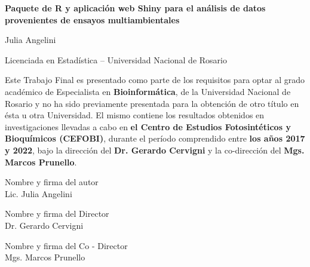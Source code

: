 
\begin{center}
\textbf{\Large{Paquete de R y aplicación web Shiny para el análisis de datos provenientes de ensayos multiambientales}}
\end{center}

\vspace{1.5cm}

\begin{center}
Julia Angelini

\vspace{0.5cm}
Licenciada en Estadística – Universidad Nacional de Rosario
\end{center}
\vspace{1.5cm}
Este Trabajo Final es presentado como parte de los requisitos para optar al grado académico de Especialista en \textbf{Bioinformática}, de la Universidad Nacional de Rosario y no ha sido previamente presentada para la obtención de otro título en ésta u otra Universidad. El mismo contiene los resultados obtenidos en investigaciones llevadas a cabo en \textbf{el Centro de Estudios Fotosintéticos y Bioquímicos (CEFOBI)}, durante el período comprendido entre \textbf{los años 2017 y 2022}, bajo la dirección del \textbf{Dr. Gerardo Cervigni} y la co-dirección del \textbf{Mgs. Marcos Prunello}.  

\vspace{1.25cm}
Nombre y firma del autor\\
\vspace{0.05cm}
\hspace{0.95cm}Lic. Julia Angelini

\vspace{1.25cm}
Nombre y firma del Director\\
\vspace{0.05cm}
\hspace{0.95cm}Dr. Gerardo Cervigni
 
\vspace{1.25cm}
Nombre y firma del Co - Director\\
\vspace{0.05cm}
\hspace{1.3cm}Mgs. Marcos Prunello
\vspace{1.85cm}


